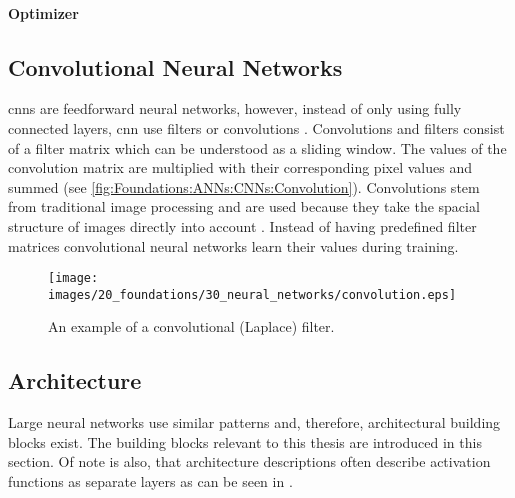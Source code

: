 \paragraph{Optimizer}
\label{par:Foundations:NeuralNetworks:Training:Optimizer}



\subsection{Convolutional Neural Networks}
\label{sec:Foundations:NeuralNetworks:CNN}

\Acp{cnn} are feedforward neural networks, however, instead of only using fully connected layers, \ac{cnn} use filters or convolutions \cite{teuwen2020convolutional}. Convolutions and filters consist of a filter matrix which can be understood as a sliding window. The values of the convolution matrix are multiplied with their corresponding pixel values and summed (see \autoref{fig:Foundations:ANNs:CNNs:Convolution}). Convolutions stem from traditional image processing \cite{shih2010image} and are used because they take the spacial structure of images directly into account \cite{nielsen2015neural}. Instead of having predefined filter matrices convolutional neural networks learn their values during training.

\begin{figure}
    \centering
    \texttt{[image: images/20\_foundations/30\_neural\_networks/convolution.eps]}
    \caption{An example of a convolutional (Laplace) filter.}
    \label{fig:Foundations:ANNs:CNNs:Convolution}
\end{figure}


\subsection{Architecture}
\label{sec:Foundations:NeuralNetworks:Architecture}

Large neural networks use similar patterns and, therefore, architectural building blocks exist. The building blocks relevant to this thesis are introduced in this section.
Of note is also, that architecture descriptions often describe activation functions as separate layers as can be seen in .

